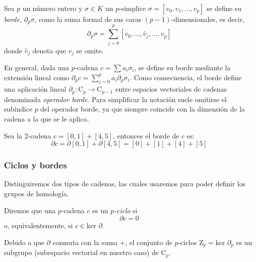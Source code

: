 \begin{definition}
Sea $p$ un número entero y $\sigma \in K$ un $p$-símplice $\sigma = [v_0, v_1, ..., v_p]$ se define su \emph{borde}, $\partial_p\sigma$, como la suma formal de sus caras $(p-1)$-dimensionales, es decir, 
\[
\partial_p\sigma = \sum_{j=0}^{p}[v_0, ..., \hat{v}_j, ..., v_p]
\]
donde $\hat{v}_j$ denota que $v_j$ se omite.
\end{definition}

En general, dada una $p$-cadena $c =\sum a_i\sigma_i$, se define su borde mediante la extensión lineal como  $\partial_p c= \sum_{j=0}^{p} a_i \partial_p \sigma_i$. Como consecuencia, el borde define una aplicación lineal $\partial_p: \text{C}_p \to \text{C}_{p-1}$ entre espacios vectoriales de cadenas denominada \emph{operador borde}. Para simplificar la notación suele omitirse el subíndice $p$ del operador borde, ya que siempre coincide con la dimensión de la cadena a la que se le aplica.

\begin{exmp}
Sea la $2$-cadena $c = [0,1] + [4,5]$, entonces el borde de $c$ es:
\[
\partial c = \partial [0,1] + \partial [4,5] = [0] + [1] + [4] + [5]
\]
\end{exmp}

\subsubsection*{Ciclos y bordes}
Distinguiremos dos tipos de cadenas, las cuales usaremos para poder definir los grupos de homología. 
\begin{definition}
Diremos que una $p$-cadena $c$ es un \emph{$p$-ciclo} si
\[
\partial c = 0
\]
o, equivalentemente, si $c \in \text{ker }\partial$.
\end{definition}

Debido a que $\partial$ conmuta con la suma $+$, el conjunto de $p$-ciclos $\text{Z}_p = \text{ker }\partial_p$ es un subgrupo (subespacio vectorial en nuestro caso) de $\text{C}_p$.

